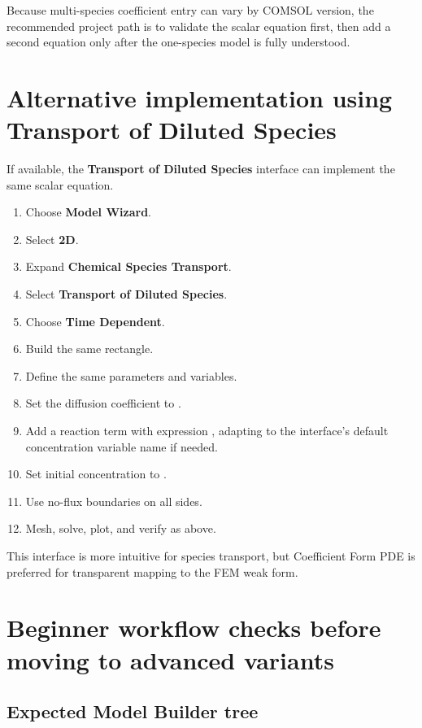 \documentclass[11pt]{article}
\newcommand{\code}[1]{\texttt{\detokenize{#1}}}
\begin{document}
Because multi-species coefficient entry can vary by COMSOL version, the recommended project path is to validate the scalar equation first, then add a second equation only after the one-species model is fully understood.

\section{Alternative implementation using Transport of Diluted Species}

If available, the \textbf{Transport of Diluted Species} interface can implement the same scalar equation.

\begin{enumerate}[leftmargin=2em]
\item Choose \textbf{Model Wizard}.
\item Select \textbf{2D}.
\item Expand \textbf{Chemical Species Transport}.
\item Select \textbf{Transport of Diluted Species}.
\item Choose \textbf{Time Dependent}.
\item Build the same rectangle.
\item Define the same parameters and variables.
\item Set the diffusion coefficient to \code{Ddef}.
\item Add a reaction term with expression \code{-kann*C + Sdef}, adapting \code{C} to the interface's default concentration variable name if needed.
\item Set initial concentration to \code{Cinit}.
\item Use no-flux boundaries on all sides.
\item Mesh, solve, plot, and verify as above.
\end{enumerate}

This interface is more intuitive for species transport, but Coefficient Form PDE is preferred for transparent mapping to the FEM weak form.


\section{Beginner workflow checks before moving to advanced variants}

\subsection{Expected Model Builder tree}
\end{document}
